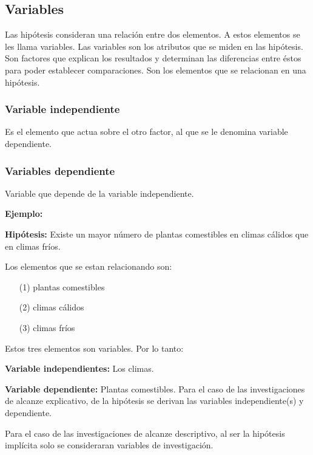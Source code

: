 \documentclass[a4paper, 12pt]{article}
\begin{document}
\subsection{Variables}
Las hipótesis consideran una relación entre dos elementos. A estos elementos se les llama variables. Las variables son los atributos que se miden en las hipótesis. Son factores que explican los resultados y determinan las diferencias entre éstos para poder establecer comparaciones. Son los elementos que se relacionan en una hipótesis. \cite{Erica} \par 
\vskip 0.2cm  
\subsubsection{Variable independiente}
Es el elemento que actua sobre el otro factor, al que se le denomina variable dependiente.

\subsubsection{Variables dependiente}
Variable que depende de la variable independiente.
\vskip 0.4cm

{\bf Ejemplo:} \cite{Erica}\par 
\vskip 0.2cm
{\bf Hipótesis:} Existe un mayor número de plantas comestibles en climas cálidos que en climas fríos. \par 
\vskip 0.2cm
Los elementos que se estan relacionando son: \par 
\begin{enumerate}
\item [(1)] plantas comestibles
\item[(2)] climas cálidos
\item[(3)] climas fríos
\end{enumerate} 
Estos tres elementos son variables. Por lo tanto:

{\bf Variable independientes:} Los climas.
\vskip 0.2cm

{\bf Variable dependiente:} Plantas comestibles.
\vskip 0.3cm
Para el caso de las investigaciones de alcanze explicativo, de la hipótesis se derivan las variables independiente(s) y dependiente.\par
\vskip 0.3cm
Para el caso de las investigaciones de alcanze descriptivo, al ser la hipótesis implícita solo se consideraran variables de investigación.\par
\vskip 0.3cm
\end{document}
